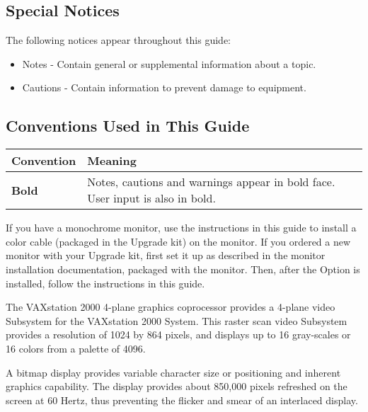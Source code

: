 \documentclass{dec}
\begin{document}
\subsection*{Special Notices}
The following notices appear throughout this guide:

\begin{itemize}
	\item Notes - Contain general or supplemental information about a topic.
	\item Cautions - Contain information to prevent damage to equipment.
\end{itemize}

\subsection*{Conventions Used in This Guide}

\begin{tabular}{m{3cm} m{7.5cm}}
\hline
\textbf{Convention} & \textbf{Meaning} \\
\hline
\textbf{Bold} & Notes, cautions and warnings appear in bold face. User input is also in bold.\\
\hline
\end{tabular}

\newpage
\setcounter{page}{1}
\pagestyle{main}


If you have a monochrome monitor, use the instructions in this guide to
install a color cable (packaged in the Upgrade kit) on the monitor.
 If you ordered a new monitor with your Upgrade kit, first set it up as described in
the monitor installation documentation, packaged with the monitor.
 Then, after the Option is installed, follow the instructions in this guide.

The VAXstation 2000 4-plane graphics coprocessor provides a 4-plane video
Subsystem for the VAXstation 2000 System. This raster scan video Subsystem
provides a resolution of 1024 by 864 pixels, and displays up to 16 gray-scales
or 16 colors from a palette of 4096.

A bitmap display provides variable character size or positioning and inherent
graphics capability. The display provides about 850,000 pixels refreshed on
the screen at 60 Hertz, thus preventing the flicker and smear of an interlaced
display.

\end{document}
